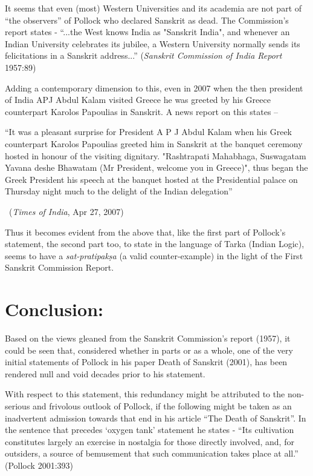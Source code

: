 It seems that even (most) Western Universities and its academia are not part of “the observers” of Pollock who declared Sanskrit as dead. The Commission’s report states  - “...the West knows India as "Sanskrit India", and whenever an Indian University celebrates its jubilee, a Western University normally sends its felicitations in a Sanskrit address...” ({\sl Sanskrit Commission of India Report} 1957:89)

Adding a contemporary dimension to this, even in 2007 when the then president of India APJ Abdul Kalam visited Greece he was greeted by his Greece counterpart Karolos Papoulias in Sanskrit. A news report on this states –
\begin{myquote}
\eleven
“It was a pleasant surprise for President A P J Abdul Kalam when his Greek counterpart Karolos Papoulias greeted him in Sanskrit at the banquet ceremony hosted in honour of the visiting dignitary.  "Rashtrapati Mahabhaga, Suswagatam Yavana deshe Bhawatam (Mr President, welcome you in Greece)", thus began the Greek President his speech at the banquet hosted at the Presidential palace on Thursday night much to the delight of the Indian delegation” 
\vskip -5pt

~\hfill ({\sl Times of India}, Apr 27, 2007) 
\end{myquote}

Thus it becomes evident from the above that, like the first part of Pollock’s statement, the second part too, to state in the language of Tarka (Indian Logic), seems to have a {\sl sat-pratipakṣa} (a valid counter-example) in the light of the First Sanskrit Commission Report.

\section{Conclusion:}

Based on the views gleaned from the Sanskrit Commission’s report (1957), it could be seen that, considered whether in parts or as a whole, one of the very initial statements of Pollock in his paper Death of Sanskrit (2001), has been rendered null and void decades prior to his statement.

With respect to this statement, this redundancy might be attributed to the non-serious and frivolous outlook of Pollock, if the following might be taken as an inadvertent admission towards that end in his article “The Death of Sanskrit”. In the sentence that precedes ‘oxygen tank’ statement he states - “Its cultivation constitutes largely an exercise in nostalgia for those directly involved, and, for outsiders, a source of bemusement that such communication takes place at all.” (Pollock  2001:393)

